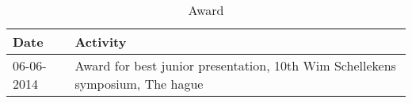 \begin{appendices}
\begin{table}
	\caption*{Award}
	\footnotesize
	\begin{tabulary}{\linewidth}{LL}
		Date & Activity \\
		\hline
		\rule{0pt}{2.5ex}\mbox{06-06-2014} & Award for best junior presentation, 10th Wim Schellekens symposium, The hague \\
		\hline
	\end{tabulary}
	\label{table:appendix_activities_7}
\end{table}
	
\end{appendices}

